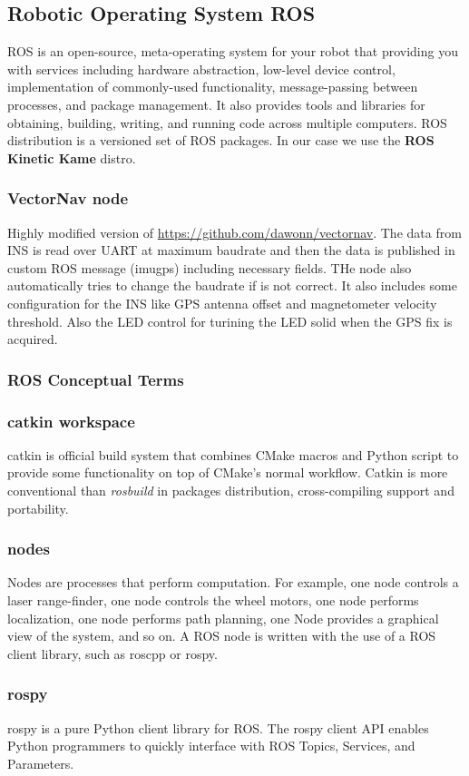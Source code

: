 \documentclass{report}
\begin{document}
\subsection{Robotic Operating System ROS}
ROS is an open-source, meta-operating system for your robot that providing you with services including hardware abstraction, low-level device control, implementation of commonly-used functionality, message-passing between processes, and package management. It also provides tools and libraries for obtaining, building, writing, and running code across multiple computers. ROS distribution is a versioned set of ROS packages. In our case we use the \textbf{ROS Kinetic Kame} distro.
\subsubsection{VectorNav node}
Highly modified version of \url{https://github.com/dawonn/vectornav}. The data from INS is read over UART at maximum baudrate and then the data is published in custom ROS message (imugps) including necessary fields. THe node also automatically tries to change the baudrate if is not correct. It also includes some configuration for the INS like GPS antenna offset and magnetometer velocity threshold. Also the LED control for turining the LED solid when the GPS fix is acquired.
\subsubsection{ROS Conceptual Terms}
\subsubsection{catkin workspace}
catkin is official build system that combines CMake macros and Python script to provide some functionality on top of  CMake's normal workflow. Catkin is more conventional than \textit{rosbuild} in packages distribution, cross-compiling support and portability. 
\subsubsection{nodes}
Nodes are processes that perform computation. For example, one node controls a laser range-finder, one node controls the wheel motors, one node performs localization, one node performs path planning, one Node provides a graphical view of the system, and so on. A ROS node is written with the use of a ROS client library, such as roscpp or rospy.
\subsubsection{rospy}
rospy is a pure Python client library for ROS. The rospy client API enables Python programmers to quickly interface with ROS Topics, Services, and Parameters.
\end{document}
